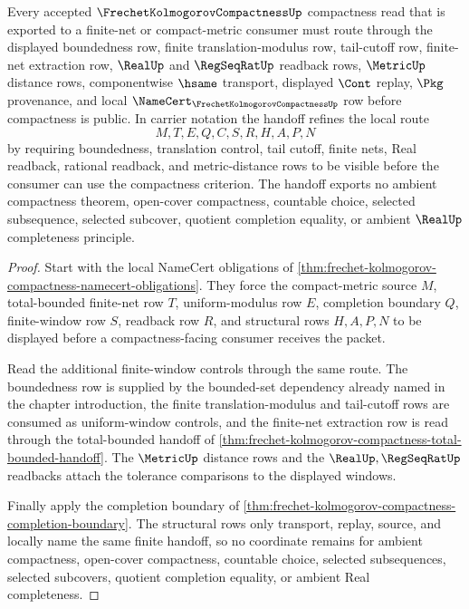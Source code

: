 \begin{theorem}
\label{thm:frechet-kolmogorov-compactness-finite-window-handoff}
Every accepted $\FrechetKolmogorovCompactnessUp$ compactness read that is exported to a finite-net or compact-metric consumer must route through the displayed boundedness row, finite translation-modulus row, tail-cutoff row, finite-net extraction row, $\RealUp$ and $\RegSeqRatUp$ readback rows, $\MetricUp$ distance rows, componentwise $\hsame$ transport, displayed $\Cont$ replay, $\Pkg$ provenance, and local $\NameCert_{\FrechetKolmogorovCompactnessUp}$ row before compactness is public. In carrier notation the handoff refines the local route
$$
M,T,E,Q,C,S,R,H,A,P,N
$$
by requiring boundedness, translation control, tail cutoff, finite nets, Real readback, rational readback, and metric-distance rows to be visible before the consumer can use the compactness criterion. The handoff exports no ambient compactness theorem, open-cover compactness, countable choice, selected subsequence, selected subcover, quotient completion equality, or ambient $\RealUp$ completeness principle.
\end{theorem}
\begin{proof}
Start with the local NameCert obligations of \autoref{thm:frechet-kolmogorov-compactness-namecert-obligations}. They force the compact-metric source $M$, total-bounded finite-net row $T$, uniform-modulus row $E$, completion boundary $Q$, finite-window row $S$, readback row $R$, and structural rows $H,A,P,N$ to be displayed before a compactness-facing consumer receives the packet.

Read the additional finite-window controls through the same route. The boundedness row is supplied by the bounded-set dependency already named in the chapter introduction, the finite translation-modulus and tail-cutoff rows are consumed as uniform-window controls, and the finite-net extraction row is read through the total-bounded handoff of \autoref{thm:frechet-kolmogorov-compactness-total-bounded-handoff}. The $\MetricUp$ distance rows and the $\RealUp,\RegSeqRatUp$ readbacks attach the tolerance comparisons to the displayed windows.

Finally apply the completion boundary of \autoref{thm:frechet-kolmogorov-compactness-completion-boundary}. The structural rows only transport, replay, source, and locally name the same finite handoff, so no coordinate remains for ambient compactness, open-cover compactness, countable choice, selected subsequences, selected subcovers, quotient completion equality, or ambient Real completeness.
\end{proof}
